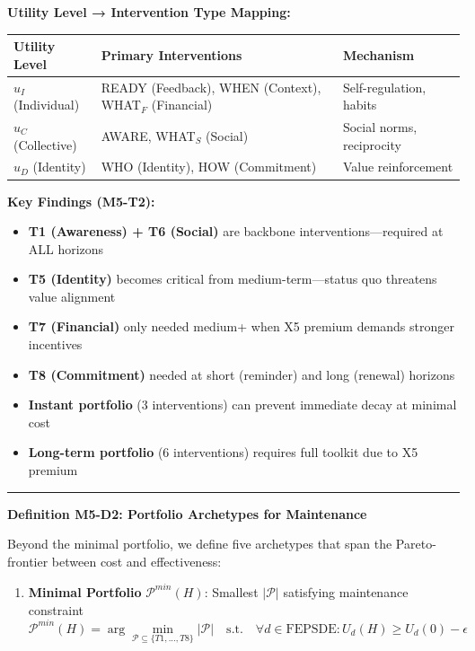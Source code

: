 \begin{tcolorbox}[colback=orange!5!white, colframe=orange!75!black,
    title=\textbf{Method UNTCM-M5: Maintenance Cost Analysis}]
\textbf{Utility Level → Intervention Type Mapping:}

\begin{center}
\renewcommand{\arraystretch}{1.2}
\begin{tabular}{@{}lll@{}}
\toprule
\textbf{Utility Level} & \textbf{Primary Interventions} & \textbf{Mechanism} \\
\midrule
$u_I$ (Individual) & READY (Feedback), WHEN (Context), WHAT$_F$ (Financial) & Self-regulation, habits \\
$u_C$ (Collective) & AWARE, WHAT$_S$ (Social) & Social norms, reciprocity \\
$u_D$ (Identity) & WHO (Identity), HOW (Commitment) & Value reinforcement \\
\bottomrule
\end{tabular}
\end{center}

\textbf{Key Findings (M5-T2):}
\begin{itemize}[nosep]
\item \textbf{T1 (Awareness) + T6 (Social)} are backbone interventions---required at ALL horizons
\item \textbf{T5 (Identity)} becomes critical from medium-term---status quo threatens value alignment
\item \textbf{T7 (Financial)} only needed medium+ when X5 premium demands stronger incentives
\item \textbf{T8 (Commitment)} needed at short (reminder) and long (renewal) horizons
\item \textbf{Instant portfolio} (3 interventions) can prevent immediate decay at minimal cost
\item \textbf{Long-term portfolio} (6 interventions) requires full toolkit due to X5 premium
\end{itemize}

\vspace{1em}
\hrule
\vspace{1em}

\textbf{Definition M5-D2: Portfolio Archetypes for Maintenance}

Beyond the minimal portfolio, we define five archetypes that span the Pareto-frontier between cost and effectiveness:

\begin{enumerate}[nosep]
\item \textbf{Minimal Portfolio} $\mathcal{P}^{min}(H)$: Smallest $|\mathcal{P}|$ satisfying maintenance constraint
\[
\mathcal{P}^{min}(H) = \arg\min_{\mathcal{P} \subseteq \{T1,...,T8\}} |\mathcal{P}| \quad \text{s.t.} \quad \forall d \in \text{FEPSDE}: U_d(H) \geq U_d(0) - \epsilon
\]


\end{enumerate}
\end{tcolorbox}
